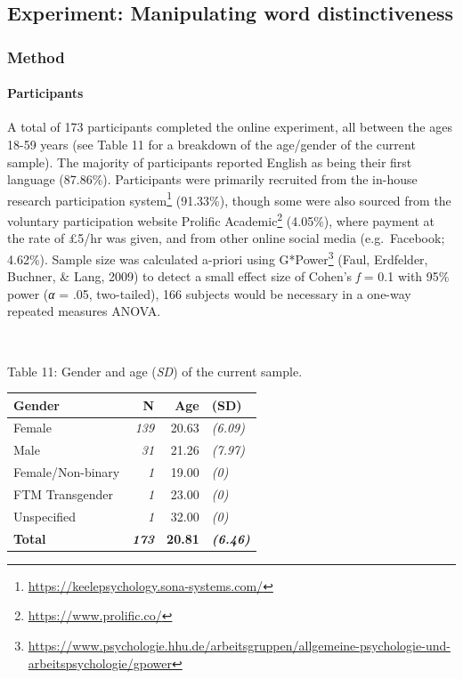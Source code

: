 \documentclass[
  11pt,
]{article}
\begin{document}
\hypertarget{experiment-manipulating-word-distinctiveness}{%
\subsection{Experiment: Manipulating word
distinctiveness}\label{experiment-manipulating-word-distinctiveness}}

\hypertarget{method-4}{%
\subsubsection{Method}\label{method-4}}

\hypertarget{participants-4}{%
\paragraph{Participants}\label{participants-4}}

\hfill\break A total of 173 participants completed the online
experiment, all between the ages 18-59 years (see Table 11 for a
breakdown of the age/gender of the current sample). The majority of
participants reported English as being their first language (87.86\%).
Participants were primarily recruited from the in-house
research participation system\footnote{\url{https://keelepsychology.sona-systems.com/}}
(91.33\%), though some were also sourced from the voluntary
participation website
Prolific Academic\footnote{\url{https://www.prolific.co/}} (4.05\%),
where payment at the rate of £5/hr was given, and from other online
social media (e.g.~Facebook; 4.62\%). Sample size was calculated
a-priori using
G*Power\footnote{\url{https://www.psychologie.hhu.de/arbeitsgruppen/allgemeine-psychologie-und-arbeitspsychologie/gpower}}
(Faul, Erdfelder, Buchner, \& Lang, 2009) to detect a small effect size
of Cohen's \emph{f} = 0.1 with 95\% power (\emph{α} = .05, two-tailed),
166 subjects would be necessary in a one-way repeated measures ANOVA.

~ ~

Table 11: Gender and age (\emph{SD}) of the current sample.

\begin{table}[!h]
\centering
\begin{tabular}{l>{}rr>{}l}
\toprule
Gender & N & Age & (SD)\\
\midrule
Female & \em{139} & 20.63 & \em{(6.09)}\\
Male & \em{31} & 21.26 & \em{(7.97)}\\
Female/Non-binary & \em{1} & 19.00 & \em{(0)}\\
FTM Transgender & \em{1} & 23.00 & \em{(0)}\\
Unspecified & \em{1} & 32.00 & \em{(0)}\\
\addlinespace
\textbf{Total} & \textbf{\em{173}} & \textbf{20.81} & \textbf{\em{(6.46)}}\\
\bottomrule
\end{tabular}
\end{table}
\end{document}
